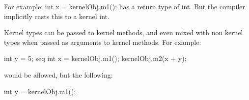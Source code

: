         For example:
            int x = kernelObj.m1();
        has a return type of int.
        But the compiler implicitly casts this to a 
        kernel int.

        Kernel types can be passed to kernel methods, and even
        mixed with non kernel types when passed as arguments to
        kernel methods. For example:

        int y = 5;
        seq {
            int x = kernelObj.m1();
            kernelObj.m2(x + y);
        }

        would be allowed, but the following:

        int y = kernelObj.m1();




















